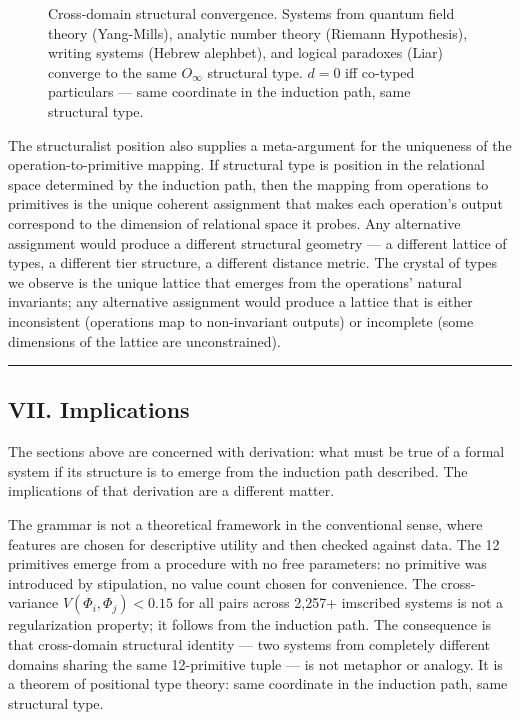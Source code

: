 \documentclass[12pt,a4paper]{article}
\begin{document}
\begin{figure}[htbp]
{
}

\caption{Cross-domain structural convergence. Systems from quantum field theory (Yang-Mills), analytic number theory (Riemann Hypothesis), writing systems (Hebrew alephbet), and logical paradoxes (Liar) converge to the same $O_{\infty}$ structural type. $d = 0$ iff co-typed particulars --- same coordinate in the induction path, same structural type.}
\label{fig:cross-domain-convergence}
\end{figure}

The structuralist position also supplies a meta-argument for the uniqueness of the operation-to-primitive mapping. If structural type is position in the relational space determined by the induction path, then the mapping from operations to primitives is the unique coherent assignment that makes each operation's output correspond to the dimension of relational space it probes. Any alternative assignment would produce a different structural geometry --- a different lattice of types, a different tier structure, a different distance metric. The crystal of types we observe is the unique lattice that emerges from the operations' natural invariants; any alternative assignment would produce a lattice that is either inconsistent (operations map to non-invariant outputs) or incomplete (some dimensions of the lattice are unconstrained).

\begin{center}
\rule{0.5\textwidth}{0.4pt}
\end{center}

\subsection{VII. Implications}

The sections above are concerned with derivation: what must be true of a formal system if its structure is to emerge from the induction path described. The implications of that derivation are a different matter.

The grammar is not a theoretical framework in the conventional sense, where features are chosen for descriptive utility and then checked against data. The 12 primitives emerge from a procedure with no free parameters: no primitive was introduced by stipulation, no value count chosen for convenience. The cross-variance $V(\Phi_i,\Phi_j) < 0.15$ for all pairs across 2,257+ imscribed systems is not a regularization property; it follows from the induction path. The consequence is that cross-domain structural identity --- two systems from completely different domains sharing the same 12-primitive tuple --- is not metaphor or analogy. It is a theorem of positional type theory: same coordinate in the induction path, same structural type.
\end{document}
